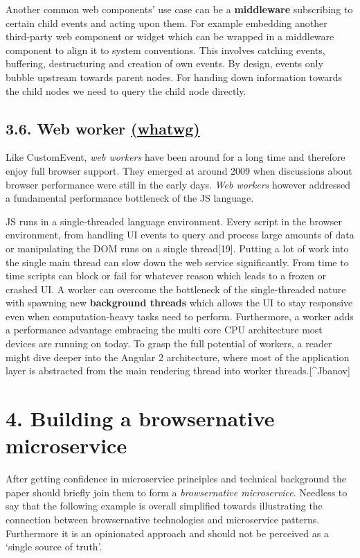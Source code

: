 \documentclass[]{article}
\begin{document}
Another common web components' use case can be a \textbf{middleware}
subscribing to certain child events and acting upon them. For example
embedding another third-party web component or widget which can be
wrapped in a middleware component to align it to system conventions.
This involves catching events, buffering, destructuring and creation of
own events. By design, events only bubble upstream towards parent nodes.
For handing down information towards the child nodes we need to query
the child node directly.

\subsection{\texorpdfstring{3.6. Web worker
\href{https://html.spec.whatwg.org/multipage/workers.html}{(whatwg)}}{3.6. Web worker (whatwg)}}\label{web-worker-whatwg}

Like CustomEvent, \emph{web workers} have been around for a long time
and therefore enjoy full browser support. They emerged at around 2009
when discussions about browser performance were still in the early days.
\emph{Web workers} however addressed a fundamental performance
bottleneck of the JS language.

JS runs in a single-threaded language environment. Every script in the
browser environment, from handling UI events to query and process large
amounts of data or manipulating the DOM runs on a single thread{[}19{]}.
Putting a lot of work into the single main thread can slow down the web
service significantly. From time to time scripts can block or fail for
whatever reason which leads to a frozen or crashed UI. A worker can
overcome the bottleneck of the single-threaded nature with spawning new
\textbf{background threads} which allows the UI to stay responsive even
when computation-heavy tasks need to perform. Furthermore, a worker adds
a performance advantage embracing the multi core CPU architecture most
devices are running on today. To grasp the full potential of workers, a
reader might dive deeper into the Angular 2 architecture, where most of
the application layer is abstracted from the main rendering thread into
worker threads.{[}\^{}Jbanov{]}

\section{4. Building a browsernative
microservice}\label{building-a-browsernative-microservice}

After getting confidence in microservice principles and technical
background the paper should briefly join them to form a
\emph{browsernative microservice}. Needless to say that the following
example is overall simplified towards illustrating the connection
between browsernative technologies and microservice patterns.
Furthermore it is an opinionated approach and should not be perceived as
a `single source of truth'.
\end{document}
